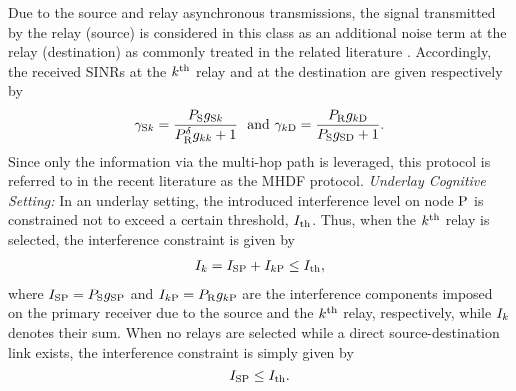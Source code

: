 \documentclass[10pt,journal]{IEEEtran}
\begin{document}
Due to the source and relay asynchronous transmissions, the signal transmitted by the relay (source) is considered in this class as an additional noise term at the relay (destination) as commonly treated in the related literature \cite{riihonen201109TWC}.  Accordingly, the received \acp{SINR} at the $k^{\rm th}$ relay and at the destination are given respectively by
\begin{eqnarray}
\gamma_{{\rm S} k}=\frac{P_{{\rm S}}g_{{\rm S} k}}{P_{{\rm R}}^\delta g_{kk} + 1}\,\,\,\, \text{and }
\gamma_{k {\rm D}}=\frac{P_{{\rm R}}g_{k {\rm D}}}{P_{{\rm S}}g_{{\rm S} {\rm D}} + 1}. \label{SNRs_of_hops_FDRS}
\end{eqnarray}
Since only the information via the multi-hop path is leveraged, this protocol is referred to in the recent literature as the \ac{MHDF} protocol.
\break\indent\textit{Underlay Cognitive Setting: }
In an underlay setting, the introduced interference level on node ${\rm P}$ is constrained not to exceed a certain threshold, $I_{\rm th}$. Thus, when the $k^{\rm th}$ relay is selected, the interference constraint is given by
\begin{eqnarray}
I_{k} = I_{{\rm S} {\rm P}} + I_{k {\rm P}} \leq I_{\rm th}, \label{interference_constraint_NDL}
\end{eqnarray}
where $I_{{\rm S} {\rm P}} =P_{{\rm S}} g_{{\rm S} {\rm P}}$ and $I_{k {\rm P}} = P_{{\rm R}} g_{k {\rm P}}$ are the interference components imposed on the primary receiver due to the source and the $k^{\rm th}$ relay, respectively, while $I_{k}$ denotes their sum. When no relays are selected while a direct source-destination link exists, the interference constraint is simply given by
\begin{equation}
I_{{\rm S} {\rm P}} \leq I_{\rm th}.
\end{equation}
\end{document}
